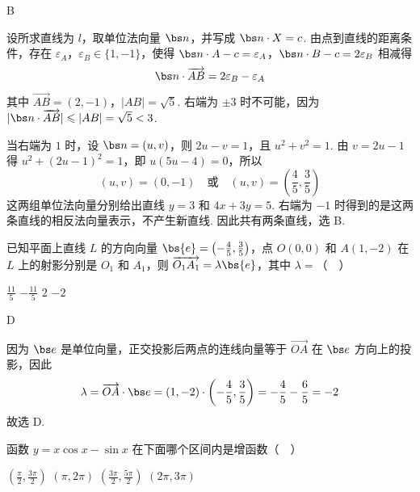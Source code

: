 \begin{answer}
B
\end{answer}

\begin{solution}
设所求直线为 \(l\)，取单位法向量 \(\bs n\)，并写成 \(\bs n\cdot X=c\). 由点到直线的距离条件，存在
\(\varepsilon_A\)，\(\varepsilon_B\in\{1,-1\}\)，使得
\(\bs n\cdot A-c=\varepsilon_A\)，\(\bs n\cdot B-c=2\varepsilon_B\)
相减得
\[
\bs n\cdot\overrightarrow{AB}=2\varepsilon_B-\varepsilon_A
\]
其中 \(\overrightarrow{AB}=(2,-1)\)，\(\lvert AB\rvert=\sqrt5\). 右端为 \(\pm3\) 时不可能，因为
\(\lvert\bs n\cdot\overrightarrow{AB}\rvert\leqslant\lvert AB\rvert=\sqrt5<3\).

当右端为 \(1\) 时，设 \(\bs n=(u,v)\)，则
\(2u-v=1\)，且 \(u^2+v^2=1\). 由 \(v=2u-1\) 得
\(u^2+(2u-1)^2=1\)，即 \(u(5u-4)=0\)，所以
\[
(u,v)=(0,-1)\quad\text{或}\quad (u,v)=\left(\frac45,\frac35\right)
\]
这两组单位法向量分别给出直线 \(y=3\) 和 \(4x+3y=5\). 右端为 \(-1\) 时得到的是这两条直线的相反法向量表示，不产生新直线. 因此共有两条直线，选 B.
\end{solution}

\begin{problem}
已知平面上直线 \(L\) 的方向向量 \(\bs{e} = \left(-\frac{4}{5}, \frac{3}{5}\right)\)，点 \(O(0,0)\) 和 \(A(1, -2)\) 在 \(L\) 上的射影分别是 \(O_{1}\) 和 \(A_{1}\)，则 \(\overrightarrow{O_{1}A_{1}} = \lambda \bs{e}\)，其中 \(\lambda =\)（\(\quad\)）

\choices
    {\(\frac{11}{5}\)}
    {\(-\frac{11}{5}\)}
    {\(2\)}
    {\(-2\)}
\end{problem}

\begin{answer}
D
\end{answer}

\begin{solution}
因为 \(\bs e\) 是单位向量，正交投影后两点的连线向量等于
\(\overrightarrow{OA}\) 在 \(\bs e\) 方向上的投影，因此
\[
\lambda=\overrightarrow{OA}\cdot\bs e=(1,-2)\cdot\left(-\frac45,\frac35\right)=-\frac45-\frac65=-2
\]
故选 D.
\end{solution}

\begin{problem}
函数 \( y = x\cos x - \sin x \) 在下面哪个区间内是增函数（\(\quad\)）

\choices
    {\(\left(\frac{\pi}{2}, \frac{3\pi}{2}\right)\)}
    {\((\pi, 2\pi)\)}
    {\(\left(\frac{3\pi}{2}, \frac{5\pi}{2}\right)\)}
    {\((2\pi, 3\pi)\)}
\end{problem}

